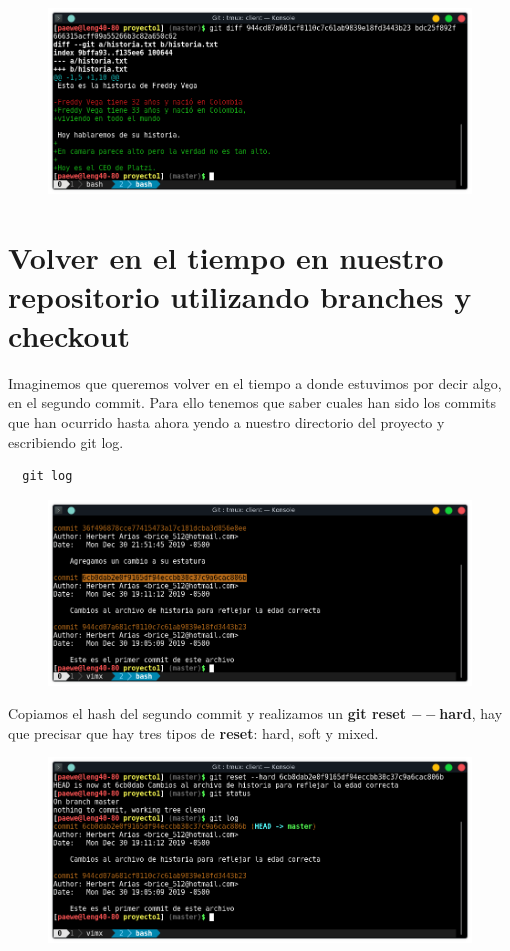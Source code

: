 \documentclass{article}
\begin{document}
\begin{figure}[h!]
  \centering
  \includegraphics[scale=0.75]{./Pictures/099_git_diff.png}
\end{figure}

\newpage

\section{Volver en el tiempo en nuestro repositorio utilizando branches y checkout}%
Imaginemos que queremos volver en el tiempo a donde estuvimos por decir algo,
en el segundo commit. Para ello tenemos que saber cuales han sido los commits
que han ocurrido hasta ahora yendo a nuestro directorio del proyecto y
escribiendo git log.

\begin{verbatim}
  git log
\end{verbatim}

\begin{figure}[h!]
  \centering
  \includegraphics[scale=0.75]{./Pictures/100_2nd_commit.png}
\end{figure}

Copiamos el hash del segundo commit y realizamos un \textbf{git reset
$--$hard}, hay que precisar que hay tres tipos de \textbf{reset}: hard, soft y
mixed.

\begin{figure}[h!]
  \centering
  \includegraphics[scale=0.75]{./Pictures/101_reset_hard.png}
\end{figure}
\end{document}
